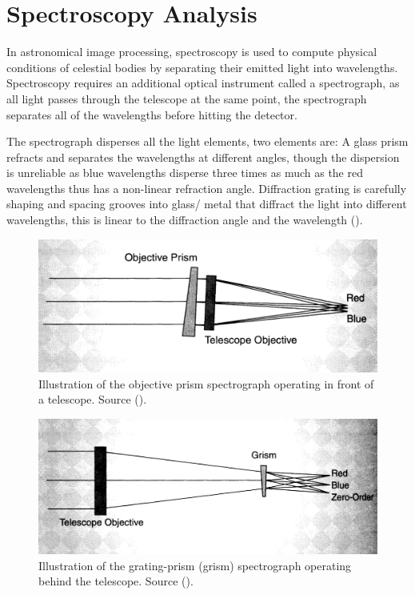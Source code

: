 \documentclass[12pt]{article}
\begin{document}
\section{Spectroscopy Analysis}
\label{Section 1}

In astronomical image processing, spectroscopy is used to compute physical conditions of celestial bodies by separating their emitted light into wavelengths. Spectroscopy requires an additional optical instrument called a spectrograph, as all light passes through the telescope at the same point, the spectrograph separates all of the wavelengths before hitting the detector. 

The spectrograph disperses all the light elements, two elements are: A glass prism refracts and separates the wavelengths at different angles, though the dispersion is unreliable as blue wavelengths disperse three times as much as the red wavelengths thus has a non-linear refraction angle. Diffraction grating is carefully shaping and spacing grooves into glass/ metal that diffract the light into different wavelengths, this is linear to the diffraction angle and the wavelength (\cite{ImageProcessing}). \\

\begin{multicols}{2}
\begin{figure}[H]
  \centering
  \ContinuedFloat*
  \includegraphics[scale=0.35]{Images/AsImages/S1/PRISM.png}
  \caption{\label{Prism}Illustration of the objective prism spectrograph operating in front of a telescope. Source (\cite{ImageProcessing}).}
\end{figure}
\begin{figure}[H]
  \centering
  \ContinuedFloat
  \includegraphics[scale=0.315]{Images/AsImages/S1/GRISM.png}
  \caption{\label{Grism}Illustration of the grating-prism (grism) spectrograph operating behind the telescope. Source (\cite{ImageProcessing}).}
\end{figure}
\end{multicols}
\end{document}
